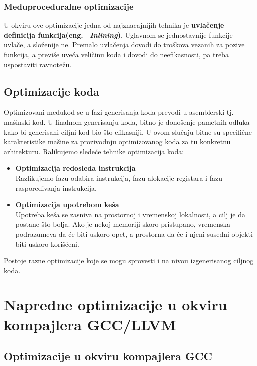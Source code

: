 \documentclass[a4paper]{article}
\begin{document}
\subsubsection{Međuproceduralne optimizacije}
\label{subsubsec:međuproceduralne} 
U okviru ove optimizacije jedna od najznacajnijih tehnika je \textbf{uvlačenje definicija funkcija(eng. ~{\em Inlining})}. 
Uglavnom se jednostavnije funkcije uvlače, a složenije ne. 
Premalo uvlačenja dovodi do troškova vezanih za pozive funkcija, a previše uveća veličinu koda i dovodi do neefikasnosti, pa treba uspostaviti ravnotežu. \cite{kkFM}


\subsection{Optimizacije koda}
\label{subsec:optimizacija_kod}
Optimizovani međukod se u fazi generisanja koda prevodi u asemblerski tj. mašinski kod. 
U finalnom generisanju koda, bitno je donošenje pametnih odluka kako bi generisani ciljni kod bio što efikasniji. 
U ovom slučaju bitne su specifične karakteristike mašine za prozivodnju optimizovanog koda za tu konkretnu arhitekturu. 
Ralikujemo sledeće tehnike optimizacija koda:
\begin{itemize}
  \item \textbf{Optimizacija redosleda instrukcija} \\
  Razlikujemo fazu odabira instrukcija, fazu alokacije registara i fazu raspoređivanja instrukcija.
  \item \textbf{Optimizacija upotrebom keša} \\
  Upotreba keša se zasniva na prostornoj i vremenskoj lokalnosti, a cilj je da postane što bolja.
  Ako je nekoj memoriji skoro pristupano, vremenska podrazumeva da će biti uskoro opet, a prostorna da će i njeni susedni objekti biti uskoro korišćeni.
 
\end{itemize} 
Postoje razne optimizacije koje se mogu sprovesti i na nivou izgenerisanog ciljnog koda. \cite{kkMVJ}


\section{Napredne optimizacije u okviru kompajlera GCC/LLVM}
\label{sec:napredneOptimizacije}

\subsection{Optimizacije u okviru kompajlera GCC}
\label{subsec:optimizacijeGCC}
\end{document}
